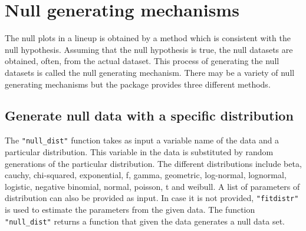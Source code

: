 \section{Null generating mechanisms}\label{null-gen}

The null plots in a lineup is obtained by a method which is consistent with the null hypothesis. Assuming that the null hypothesis is true, the null datasets are obtained, often, from the actual dataset. This process of generating the null datasets is called the null generating mechanism. There may be a variety of null generating mechanisms but the package provides
three different methods.

\subsection{Generate null data with a specific
distribution}\label{generate-null-data-with-a-specific-distribution}

The \texttt{"null\_dist"} function takes as input a variable name of the
data and a particular distribution. This variable in the data is
substituted by random generations of the particular distribution. The
different distributions include beta, cauchy, chi-squared, exponential,
f, gamma, geometric, log-normal, lognormal, logistic, negative binomial,
normal, poisson, t and weibull. A list of parameters of distribution can
also be provided as input. In case it is not provided,
\texttt{"fitdistr"} is used to estimate the parameters from the given
data. The function \texttt{"null\_dist"} returns a function that given
the data generates a null data set.


